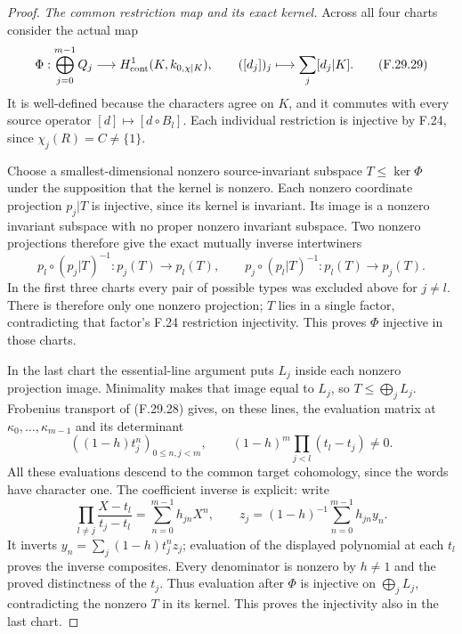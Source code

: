 \begin{proof}
\emph{The common restriction map and its exact kernel.}
Across all four charts consider the actual map
\[
 \Phi:\bigoplus_{j=0}^{m-1}Q_j
       \longrightarrow H^1_{\rm cont}(K,k_{0,\chi|K}),
       \qquad ([d_j])_j\longmapsto\sum_j[d_j|K].
                                                               \tag{F.29.29}
\]
It is well-defined because the characters
agree on $K$, and it commutes with every
source operator $[d]\mapsto[d\circ B_l]$.
Each individual restriction is injective
by F.24, since $\chi_j(R)=C\ne\{1\}$.

Choose a smallest-dimensional nonzero
source-invariant subspace $T\leq\ker\Phi$
under the supposition that the kernel is nonzero.
Each nonzero coordinate projection $p_j|T$
is injective, since its kernel is invariant.
Its image is a nonzero invariant subspace
with no proper nonzero invariant subspace.
Two nonzero projections therefore give the
exact mutually inverse intertwiners
\[
 p_l\circ(p_j|T)^{-1}:p_j(T)\longrightarrow p_l(T),
 \qquad p_j\circ(p_l|T)^{-1}:p_l(T)\longrightarrow p_j(T).
                                                               \tag{F.29.30}
\]
In the first three charts every pair of
possible types was excluded above for $j\ne l$.
There is therefore only one nonzero projection;
$T$ lies in a single factor, contradicting
that factor's F.24 restriction injectivity.
This proves $\Phi$ injective in those charts.

In the last chart the essential-line argument
puts $L_j$ inside each nonzero projection
image. Minimality makes that image equal to
$L_j$, so $T\leq\bigoplus_jL_j$.
Frobenius transport of (F.29.28) gives, on
these lines, the evaluation matrix at
$\kappa_0,\ldots,\kappa_{m-1}$ and its determinant
\[
 ((1-h)t_j^n)_{0\leq n,j<m},
 \qquad (1-h)^m\prod_{j<l}(t_l-t_j)\ne0.
                                                               \tag{F.29.31}
\]
All these evaluations descend to the common
target cohomology, since the words have
character one. The coefficient inverse is
explicit: write
\[
 \prod_{l\ne j}\frac{X-t_l}{t_j-t_l}
       =\sum_{n=0}^{m-1}h_{jn}X^n,
 \qquad z_j=(1-h)^{-1}\sum_{n=0}^{m-1}h_{jn}y_n.
                                                               \tag{F.29.32}
\]
It inverts $y_n=\sum_j(1-h)t_j^nz_j$;
evaluation of the displayed polynomial at
each $t_l$ proves the inverse composites.
Every denominator is nonzero by $h\ne1$
and the proved distinctness of the $t_j$.
Thus evaluation after $\Phi$ is injective
on $\bigoplus_jL_j$, contradicting the nonzero
$T$ in its kernel. This proves the injectivity
also in the last chart.


\end{proof}
